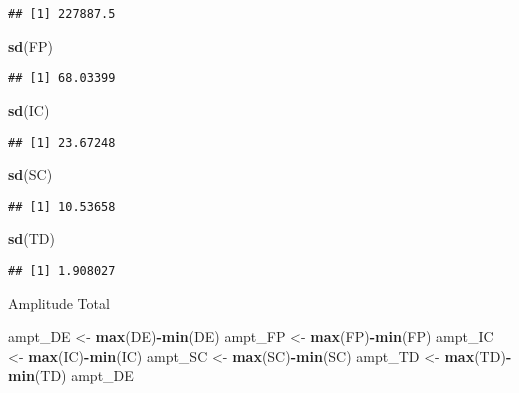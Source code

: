 \documentclass[]{article}
\newenvironment{Shaded}{\begin{snugshade}}{\end{snugshade}}
\newcommand{\KeywordTok}[1]{\textcolor[rgb]{0.13,0.29,0.53}{\textbf{#1}}}
\newcommand{\NormalTok}[1]{#1}
\newcommand{\OperatorTok}[1]{\textcolor[rgb]{0.81,0.36,0.00}{\textbf{#1}}}
\newcommand{\StringTok}[1]{\textcolor[rgb]{0.31,0.60,0.02}{#1}}
\begin{document}
\begin{verbatim}
## [1] 227887.5
\end{verbatim}

\begin{Shaded}
\begin{Highlighting}[]
\KeywordTok{sd}\NormalTok{(FP)}
\end{Highlighting}
\end{Shaded}

\begin{verbatim}
## [1] 68.03399
\end{verbatim}

\begin{Shaded}
\begin{Highlighting}[]
\KeywordTok{sd}\NormalTok{(IC)}
\end{Highlighting}
\end{Shaded}

\begin{verbatim}
## [1] 23.67248
\end{verbatim}

\begin{Shaded}
\begin{Highlighting}[]
\KeywordTok{sd}\NormalTok{(SC)}
\end{Highlighting}
\end{Shaded}

\begin{verbatim}
## [1] 10.53658
\end{verbatim}

\begin{Shaded}
\begin{Highlighting}[]
\KeywordTok{sd}\NormalTok{(TD)}
\end{Highlighting}
\end{Shaded}

\begin{verbatim}
## [1] 1.908027
\end{verbatim}

Amplitude Total

\begin{Shaded}
\begin{Highlighting}[]
\NormalTok{ampt_DE <-}\StringTok{ }\KeywordTok{max}\NormalTok{(DE)}\OperatorTok{-}\KeywordTok{min}\NormalTok{(DE)}
\NormalTok{ampt_FP <-}\StringTok{ }\KeywordTok{max}\NormalTok{(FP)}\OperatorTok{-}\KeywordTok{min}\NormalTok{(FP)}
\NormalTok{ampt_IC <-}\StringTok{ }\KeywordTok{max}\NormalTok{(IC)}\OperatorTok{-}\KeywordTok{min}\NormalTok{(IC)}
\NormalTok{ampt_SC <-}\StringTok{ }\KeywordTok{max}\NormalTok{(SC)}\OperatorTok{-}\KeywordTok{min}\NormalTok{(SC)}
\NormalTok{ampt_TD <-}\StringTok{ }\KeywordTok{max}\NormalTok{(TD)}\OperatorTok{-}\KeywordTok{min}\NormalTok{(TD)}
\NormalTok{ampt_DE}
\end{Highlighting}
\end{Shaded}
\end{document}
